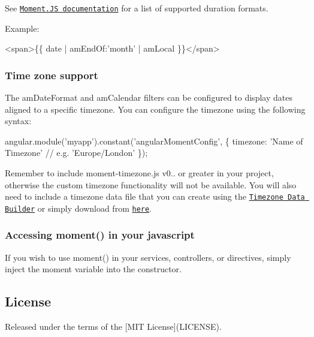 See \href{http://momentjs.com/docs/#/manipulating/end-of/}{\tt Moment.\+JS documentation} for a list of supported duration formats.

Example\+:


\begin{DoxyCode}
<span>\{\{ date | amEndOf:'month' | amLocal \}\}</span>
\end{DoxyCode}


\subsubsection*{Time zone support}

The {\ttfamily am\+Date\+Format} and {\ttfamily am\+Calendar} filters can be configured to display dates aligned to a specific timezone. You can configure the timezone using the following syntax\+:


\begin{DoxyCode}
angular.module('myapp').constant('angularMomentConfig', \{
    timezone: 'Name of Timezone' // e.g. 'Europe/London'
\});
\end{DoxyCode}


Remember to include {\ttfamily moment-\/timezone.\+js} v0.. or greater in your project, otherwise the custom timezone functionality will not be available. You will also need to include a timezone data file that you can create using the \href{http://momentjs.com/timezone/}{\tt Timezone Data Builder} or simply download from \href{https://rawgithub.com/qw4n7y/7282780/raw/6ae3b334b295f93047e8f3ad300db6bc4387e235/moment-timezone-data.js}{\tt here}.

\subsubsection*{Accessing {\ttfamily moment()} in your javascript}

If you wish to use {\ttfamily moment()} in your services, controllers, or directives, simply inject the {\ttfamily moment} variable into the constructor.

\subsection*{License }

Released under the terms of the \mbox{[}M\+IT License\mbox{]}(L\+I\+C\+E\+N\+SE). 